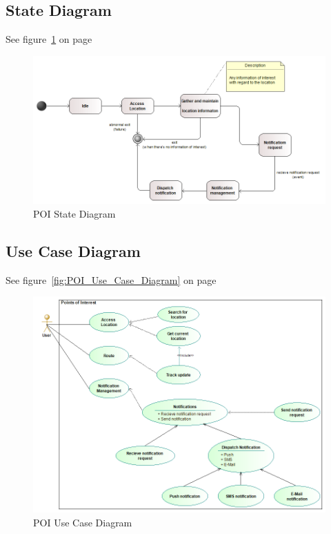  \subsection{State Diagram}
See figure~\ref{fig:POI_State_Diagram} on page~\pageref{fig:POI_State_Diagram}
\begin{figure}[H]
	\centering
	\includegraphics[scale=0.54]{POI/poi_state_diagram.png}
	\caption{POI State Diagram}
	\label{fig:POI_State_Diagram}
\end{figure}
		
 \subsection{Use Case Diagram}
See figure~\ref{fig:POI_Use_Case_Diagram} on page~\pageref{fig:POI_Use_Case_Diagram}
\begin{figure}[H]
	\centering
	\includegraphics[scale=0.54]{POI/poi_use_case_diagram.png}
	\caption{POI Use Case Diagram}
	\label{fig:POI_Use_Casee_Diagram}
\end{figure}
